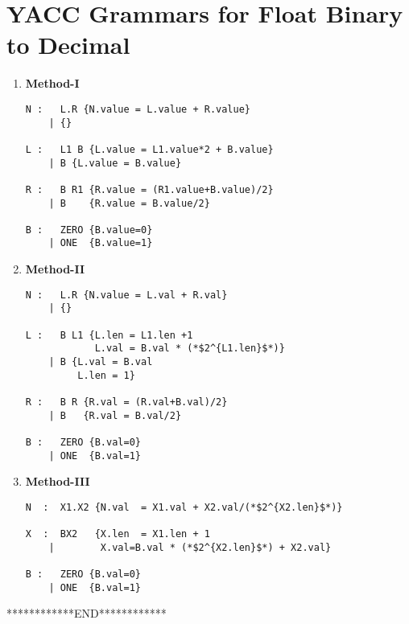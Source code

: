 \documentclass[english,a4paper,12pt]{article}
\begin{document}
\section{YACC Grammars for Float Binary to Decimal} 
\begin{enumerate}
    \item \textbf{Method-I}
    \begin{lstlisting}
N :   L.R {N.value = L.value + R.value}
    | {}

L :   L1 B {L.value = L1.value*2 + B.value}
    | B {L.value = B.value}

R :   B R1 {R.value = (R1.value+B.value)/2}
    | B    {R.value = B.value/2}

B :   ZERO {B.value=0}
    | ONE  {B.value=1}
\end{lstlisting}
\item \textbf{Method-II} 
\begin{lstlisting}
N :   L.R {N.value = L.val + R.val}
    | {}

L :   B L1 {L.len = L1.len +1
            L.val = B.val * (*$2^{L1.len}$*)}
    | B {L.val = B.val
         L.len = 1}

R :   B R {R.val = (R.val+B.val)/2}
    | B   {R.val = B.val/2}

B :   ZERO {B.val=0}
    | ONE  {B.val=1}
\end{lstlisting}
\newpage 
\item \textbf{Method-III} 
\begin{lstlisting}
N  :  X1.X2 {N.val  = X1.val + X2.val/(*$2^{X2.len}$*)}

X  :  BX2   {X.len  = X1.len + 1
    |        X.val=B.val * (*$2^{X2.len}$*) + X2.val}
     
B :   ZERO {B.val=0}
    | ONE  {B.val=1}
\end{lstlisting}
\end{enumerate}

************END************
\newpage    
\end{document}
